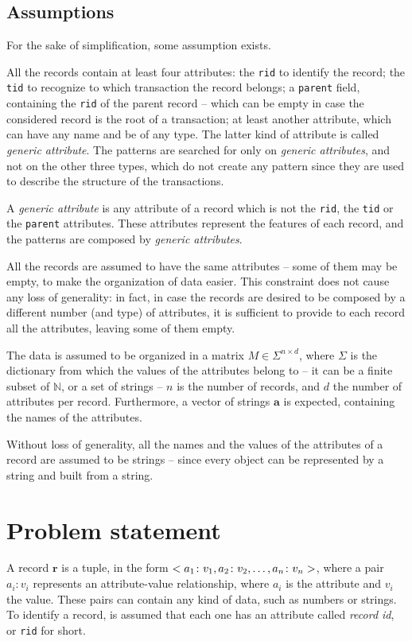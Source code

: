 \documentclass{acm_proc_article-sp-sigmod09}
\begin{document}
\subsection{Assumptions}
\label{sec:assumptions}
For the sake of simplification, some assumption exists.

All the records contain at least four attributes: the \texttt{rid} to identify the record; the \texttt{tid} to recognize to which transaction the record belongs; a \texttt{parent} field, containing the \texttt{rid} of the parent record -- which can be empty in case the considered record is the root of a transaction; at least another attribute, which can have any name and be of any type. The latter kind of attribute is called \emph{generic attribute}. The patterns are searched for only on \emph{generic attributes}, and not on the other three types, which do not create any pattern since they are used to describe the structure of the transactions.

\begin{definition}
A \emph{generic attribute} is any attribute of a record which is not the \texttt{rid}, the \texttt{tid} or the \texttt{parent} attributes. These attributes represent the features of each record, and the patterns are composed by \emph{generic attributes}.
\end{definition}

All the records are assumed to have the same attributes -- some of them may be empty, to make the organization of data easier. This constraint does not cause any loss of generality: in fact, in case the records are desired to be composed by a different number (and type) of attributes, it is sufficient to provide to each record all the attributes, leaving some of them empty.

The data is assumed to be organized in a matrix $M \in \Sigma^{n \times d}$, where $\Sigma$ is the dictionary from which the values of the attributes belong to -- it can be a finite subset of $\mathbb{N}$, or a set of strings -- $n$ is the number of records, and $d$ the number of attributes per record. Furthermore, a vector of strings $\boldsymbol{a}$ is expected, containing the names of the attributes.

Without loss of generality, all the names and the values of the attributes of a record are assumed to be strings -- since every object can be represented by a string and built from a string.

\section{Problem statement}
A record $\boldsymbol{r}$ is a tuple, in the form $<a_1 \colon v_1, a_2 \colon v_2, \text{\dots}, a_n \colon v_n>$, where a pair $a_i \colon v_i$ represents an attribute-value relationship, where $a_i$ is the attribute and $v_i$ the value. These pairs can contain any kind of data, such as numbers or strings. To identify a record, is assumed that each one has an attribute called \emph{record id}, or \texttt{rid} for short.
\end{document}
